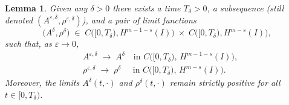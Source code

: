 \documentclass[12pt]{amsart}
\newtheorem{lemma}{Lemma}
\begin{document}
\begin{lemma} \label{LemmaExistenceDelta1}
		Given any $\delta>0$ there exists a time $T_{\delta}>0$, a subsequence (still denoted $(A^{\varepsilon,\delta},\rho^{\varepsilon,\delta})$), and a pair of limit functions
$$
\bigl(A^\delta,\rho^\delta\bigr)\;\in\;C\bigl([0,T_\delta),H^{m-1-s}(I)\bigr)\;\times\;C\bigl([0,T_\delta),H^{m-s}(I)\bigr),
$$
such that, as $\varepsilon\to0$,
\[
\begin{split}
& A^{\varepsilon,\delta}\;\longrightarrow\;A^\delta
\quad\text{in }C\bigl([0,T_\delta),\,H^{m-1-s}(I)\bigr),
\\
&\rho^{\varepsilon,\delta}\;\longrightarrow\;\rho^\delta
\quad \ \, \text{in }C\bigl([0,T_\delta),\,H^{m-s}(I)\bigr).
\end{split}
\]
Moreover,  the limits $A^\delta(t,\cdot)$ and $\rho^\delta(t,\cdot)$ remain strictly positive for all $t\in[0,T_\delta)$.
	\end{lemma}
\end{document}
